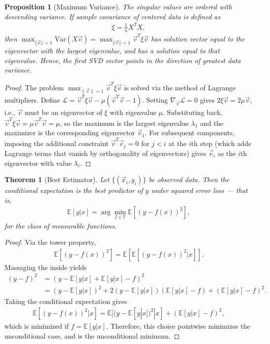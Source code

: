 \documentclass[11pt]{article}
\theoremstyle{definition}
\theoremstyle{plain}
\newtheorem{theorem}{Theorem}[section]
\newtheorem{proposition}{Proposition}[section]
\theoremstyle{remark}
\begin{document}
\begin{proposition}[Maximum Variance]
    The singular values are ordered with descending variance. If sample covariance of centered data is defined as
    \begin{align}
        \xi = \frac 1n X^TX,
    \end{align}
    then $\max_{||\vec{v}||=1} \text{Var}(X\vec{v}) = \max_{||\vec{v}||=1} \vec{v}^T \xi \vec{v}$ has solution vector equal to the eigenvector with the largest eigenvalue, and has a solution equal to that eigenvalue. Hence, the first SVD vector points in the direction of greatest data variance.
\end{proposition}
\begin{proof}
    The problem $\max_{\|\vec{v}\|=1} \vec{v}^T \xi \vec{v}$ is solved via the method of Lagrange multipliers. Define $\mathcal{L} = \vec{v}^T\xi\vec{v} - \mu(\vec{v}^T\vec{v} - 1)$. Setting $\nabla_{\vec{v}}\mathcal{L} = 0$ gives $2\xi\vec{v} = 2\mu\vec{v}$, i.e., $\vec{v}$ must be an eigenvector of $\xi$ with eigenvalue $\mu$. Substituting back, $\vec{v}^T\xi\vec{v} = \mu\vec{v}^T\vec{v} = \mu$, so the maximum is the largest eigenvalue $\lambda_1$ and the maximizer is the corresponding eigenvector $\vec{v}_1$. For subsequent components, imposing the additional constraint $\vec{v}^T\vec{v}_j = 0$ for $j < i$ at the $i$th step (which adds Lagrange terms that vanish by orthogonality of eigenvectors) gives $\vec{v}_i$ as the $i$th eigenvector with value $\lambda_i$.
\end{proof}

\begin{theorem}[Best Estimator]
    Let $\{(\vec{x}_i,y_i)\}$ be observed data. Then the conditional expectation is the best predictor of $y$ under squared error loss --- that is,
    \begin{align}
    \mathbb{E}[y|x] = \arg \min_{f \in \mathbb{F}}\mathbb{E}[(y-f(x))^2],
    \end{align}
    for the class of measurable functions.
\end{theorem}
\begin{proof}
    Via the tower property,
    \begin{align}
        \mathbb{E}[(y-f(x))^2] = \mathbb{E}[\mathbb{E}[(y-f(x))^2|x]].
    \end{align}
    Massaging the inside yields
    \begin{align}
        (y-f)^2 &= (y -\mathbb{E}[y|x] + \mathbb{E}[y|x] -f)^2\\
        & = (y -\mathbb{E}[y|x])^2 +2(y -\mathbb{E}[y|x])(\mathbb{E}[y|x] -f) + (\mathbb{E}[y|x] -f)^2.
    \end{align}
    Taking the conditional expectation gives
    \begin{align}
        \mathbb{E}[(y-f(x))^2|x]= \mathbb{E}[(y -\mathbb{E}[y|x])^2|x] + (\mathbb{E}[y|x] -f)^2,
    \end{align}
    which is minimized if $f = \mathbb{E}[y|x]$. Therefore, this choice pointwise minimizes the unconditional case, and is the unconditional minimum.
\end{proof}
\end{document}

